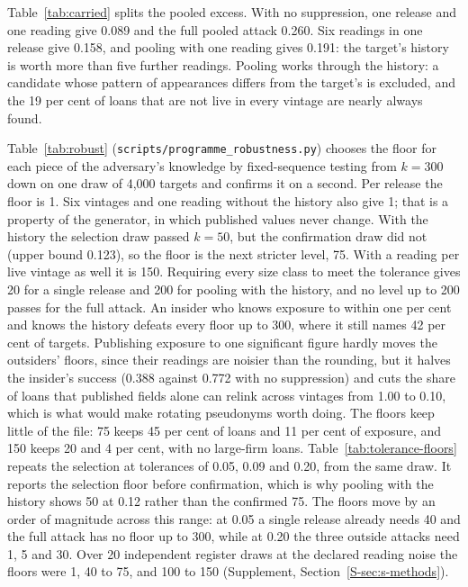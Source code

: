 Table~\ref{tab:carried} splits the pooled excess. With no suppression, one release and one reading give 0.089 and the full pooled attack 0.260. Six readings in one release give 0.158, and pooling with one reading gives 0.191: the target's history is worth more than five further readings. Pooling works through the history: a candidate whose pattern of appearances differs from the target's is excluded, and the 19 per cent of loans that are not live in every vintage are nearly always found.

\begingroup\let\small\footnotesize\endgroup

Table~\ref{tab:robust} (\nolinkurl{scripts/programme_robustness.py}) chooses the floor for each piece of the adversary's knowledge by fixed-sequence testing from $k=300$ down on one draw of 4{,}000 targets and confirms it on a second. Per release the floor is 1. Six vintages and one reading without the history also give 1; that is a property of the generator, in which published values never change. With the history the selection draw passed $k=50$, but the confirmation draw did not (upper bound 0.123), so the floor is the next stricter level, 75. With a reading per live vintage as well it is 150. Requiring every size class to meet the tolerance gives 20 for a single release and 200 for pooling with the history, and no level up to 200 passes for the full attack. An insider who knows exposure to within one per cent and knows the history defeats every floor up to 300, where it still names 42 per cent of targets. Publishing exposure to one significant figure hardly moves the outsiders' floors, since their readings are noisier than the rounding, but it halves the insider's success (0.388 against 0.772 with no suppression) and cuts the share of loans that published fields alone can relink across vintages from 1.00 to 0.10, which is what would make rotating pseudonyms worth doing. The floors keep little of the file: 75 keeps 45 per cent of loans and 11 per cent of exposure, and 150 keeps 20 and 4 per cent, with no large-firm loans. Table~\ref{tab:tolerance-floors} repeats the selection at tolerances of 0.05, 0.09 and 0.20, from the same draw. It reports the selection floor before confirmation, which is why pooling with the history shows 50 at 0.12 rather than the confirmed 75. The floors move by an order of magnitude across this range: at 0.05 a single release already needs 40 and the full attack has no floor up to 300, while at 0.20 the three outside attacks need 1, 5 and 30. Over 20 independent register draws at the declared reading noise the floors were 1, 40 to 75, and 100 to 150 (Supplement, Section~\ref{S-sec:s-methods}).


